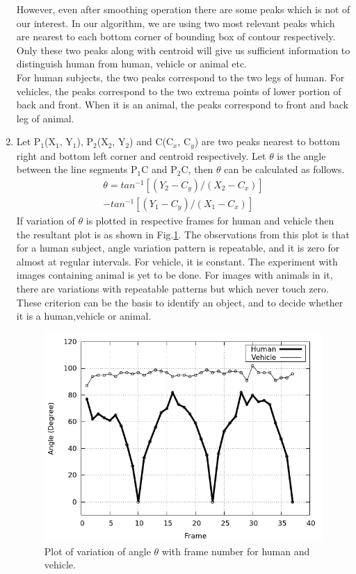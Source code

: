 \documentclass[conference]{IEEEtran}
\begin{document}
\begin{enumerate}
\indent However, even after smoothing operation there are some peaks which is
not of our interest.  In our algorithm, we are using two most relevant
peaks which are nearest to each bottom corner of bounding box of contour
respectively.  Only these two peaks along with centroid will give us
sufficient information to distinguish human from human, vehicle or
animal etc. \\
\indent For human subjects, the two peaks correspond to
the two legs of human. For vehicles, the peaks
correspond to the two extrema points of lower portion of back and front.
When it is an animal, the peaks correspond to front and back leg of
animal.\\
\item Let P$_1$(X$_1$, Y$_1$), P$_2$(X$_2$, Y$_2$) and C(C$_x$, C$_y$)
are two peaks nearest to bottom right and bottom left corner and
centroid respectively. Let $\theta$ is the angle between the line
segments P$_1$C and P$_2$C, then $\theta$ can be calculated as
follows.\\
%
	\begin{equation}
	\begin{split}
	\theta = tan^{-1}[(Y_2 - C_y) / (X_2 - C_x)] \\
	 - tan^{-1}[(Y_1 - C_y) / (X_1 - C_x)]
	\end{split}
	\end{equation}
%
\indent If variation of $\theta$ is plotted in respective frames for
human and vehicle then the resultant plot is as shown in Fig.\ref{angle_plot}.
The observations from this plot is that for a  human
subject, angle variation pattern is repeatable, and it is zero for
almost at regular intervals.  For vehicle, it is constant. The
experiment with images containing animal is yet to be done. For images
with animals in it, there are variations with repeatable patterns but
which never touch zero.  These criterion can be the basis to identify an
object, and to decide whether it is a human,vehicle or animal.

\begin{figure}[!h]
\centering
\includegraphics[scale=0.35]{figures/angle_plot}
\caption{Plot of variation of angle $\theta$ with frame number for human and
vehicle.}
\label{angle_plot}
\end{figure}


\end{enumerate}
\end{document}
